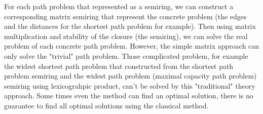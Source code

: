 \documentclass[a4paper,10pt]{article}
\begin{document}
For each path problem that represented as a semiring, we can construct a corresponding matrix semiring that represent the concrete problem (the edges and the distances for the shortest path problem for example). Then using matrix multiplication and stability of the closure (the semiring), we can solve the real problem of each concrete path problem. However, the simple matrix approach can only solve the "trivial" path problem. Those complicated problem, for example the widest shortest path problem that constructed from the shortest path problem semiring and the widest path problem (maximal capacity path problem) semiring using lexicograhpic product, can't be solved by this "traditional" theory approach. Some times even the method can find an optimal solution, there is no guarantee to find all optimal solutions using the classical method.
\end{document}
